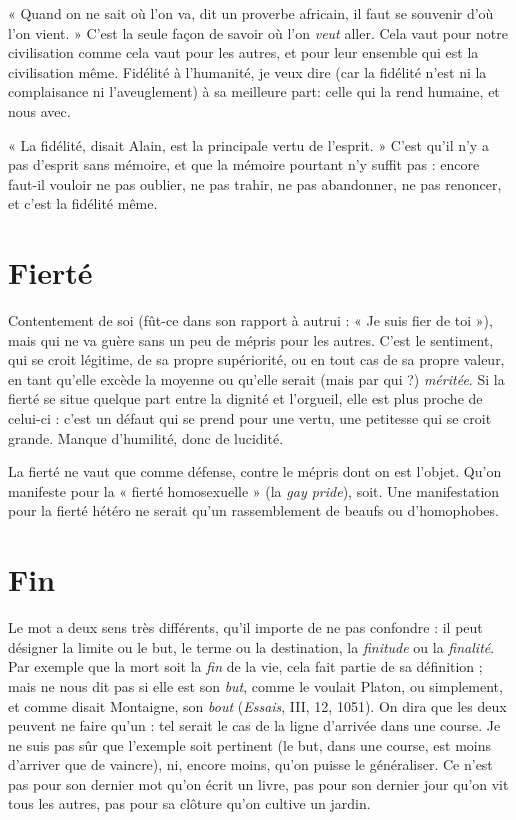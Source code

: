 « Quand on ne sait où l’on va, dit un proverbe africain, il faut se souvenir
d’où l’on vient. » C’est la seule façon de savoir où l’on {\it veut} aller. Cela vaut pour
notre civilisation comme cela vaut pour les autres, et pour leur ensemble qui est
la civilisation même. Fidélité à l'humanité, je veux dire (car la fidélité n’est ni
la complaisance ni l’aveuglement) à sa meilleure part: celle qui la rend
humaine, et nous avec.

« La fidélité, disait Alain, est la principale vertu de l'esprit. » C’est qu’il n’y
a pas d’esprit sans mémoire, et que la mémoire pourtant n’y suffit pas : encore
faut-il vouloir ne pas oublier, ne pas trahir, ne pas abandonner, ne pas
renoncer, et c’est la fidélité même.

\section{Fierté}
Contentement de soi (fût-ce dans son rapport à autrui : « Je suis
fier de toi »), mais qui ne va guère sans un peu de mépris pour les
autres. C’est le sentiment, qui se croit légitime, de sa propre supériorité, ou en
tout cas de sa propre valeur, en tant qu’elle excède la moyenne ou qu’elle serait
(mais par qui ?) {\it méritée}. Si la fierté se situe quelque part entre la dignité et
l’orgueil, elle est plus proche de celui-ci : c’est un défaut qui se prend pour une
vertu, une petitesse qui se croit grande. Manque d’humilité, donc de lucidité.

La fierté ne vaut que comme défense, contre le mépris dont on est l’objet.
Qu’on manifeste pour la « fierté homosexuelle » (la {\it gay pride}), soit. Une manifestation
pour la fierté hétéro ne serait qu’un rassemblement de beaufs ou
d’homophobes.

\section{Fin}
Le mot a deux sens très différents, qu’il importe de ne pas confondre :
il peut désigner la limite ou le but, le terme ou la destination, la {\it finitude}
ou la {\it finalité}. Par exemple que la mort soit la {\it fin} de la vie, cela fait partie
de sa définition ; mais ne nous dit pas si elle est son {\it but}, comme le voulait
Platon, ou simplement, et comme disait Montaigne, son {\it bout} ({\it Essais}, III, 12,
1051). On dira que les deux peuvent ne faire qu’un : tel serait le cas de la ligne
d’arrivée dans une course. Je ne suis pas sûr que l’exemple soit pertinent (le but,
dans une course, est moins d’arriver que de vaincre), ni, encore moins, qu’on
puisse le généraliser. Ce n’est pas pour son dernier mot qu’on écrit un livre, pas
pour son dernier jour qu’on vit tous les autres, pas pour sa clôture qu’on cultive
un jardin.


